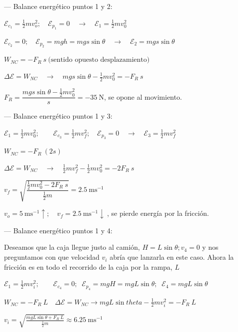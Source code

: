\vspace{7mm} %
--- Balance energético puntos 1 y 2:

$\mathcal E_{c_1}=\frac 1 2 m v_o^2;\quad \mathcal E_{p_1}=0 \quad \to \quad \mathcal E_1=\frac 1 2 m v_0^2$

$\mathcal E_{c_2}=0;\quad \mathcal E_{p_2}=mgh=mgs \sin \theta \quad \to \quad \mathcal E_2=mgs \sin \theta$

$W_{NC}=-F_R  \ s \ \text{(sentido opuesto desplazamiento)}$

$\Delta \mathcal E=W_{NC} \quad \to \quad mgs \sin \theta - \frac 1 2 m v_0^2=-F_R \ s $

$F_R= \dfrac{mgs \sin \theta - \frac 1 2 m v_0^2}{s}=-35 \ \mathrm{N}$, se opone al movimiento.


\vspace{7mm} %
--- Balance energético puntos 1 y 3:

$\mathcal E_1=\frac 1 2 m v_0^2; \qquad \mathcal E_{c_3}=\frac 1 2 m v_f^2; \quad \mathcal E_{p_3}=0  \quad \to \quad \mathcal E_3=\frac 1 2 m v_f^2 $

$W_{NC}=-F_R\ (2s)$

$\Delta \mathcal E=W_{NC} \quad \to \quad \frac 1 2 m v_f^2-\frac 1 2 m v_0^2=-2F_R \ s$

$v_f=\sqrt{\dfrac{\frac 1 2 m v_0^2-2F_R\ s}{\frac 1 2 m}}=2.5\ \mathrm{ms}^{-1}$

$v_o=5\ \mathrm{ms}^{-1} \uparrow; \quad v_f=2.5\ \mathrm{ms}^{-1} \downarrow \ $, se pierde energía por la fricción.

\vspace{7mm} %
--- Balance energético puntos 1 y 4:

Deseamos que la caja llegue justo al camión, $H=L\sin \theta; v_4=0$ y nos preguntamos con que velocidad $v_i$ abría que lanzarla en este caso. Ahora la fricción es en todo el recorrido de la caja por la rampa, $L$

$\mathcal E_1=\frac 1 2 m v_i^2; \qquad \mathcal E_{c_4}=0;\;\; \mathcal E_{p_4}=mgH=mgL\sin \theta;\;\; \mathcal E_4=mgL\sin \theta$

$W_{NC}=-F_R\ L \quad \Delta \mathcal E=W_{NC} \to mgL\sin theta -\frac 1 2 m v_i^2=-F_R\ L$

$v_i=\sqrt{\frac{mgL\sin \theta + F_R\ L}{\frac 1 2 m}}\approx 6.25 \ \mathrm{m s}^{-1}$


